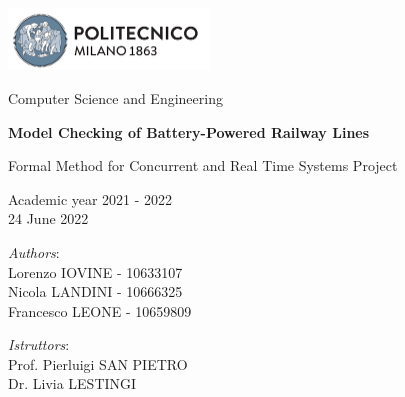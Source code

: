 
\usepackage{listings}





{\begin{titlepage}
     \begin{center}
         \includegraphics[width=0.4\textwidth]{images/PolimiLogo.png}

         \vspace{0.2cm}

         \Large Computer Science and Engineering

         \vspace{0.9cm}

         \Huge \textbf{Model Checking of Battery-Powered Railway Lines}

         \vspace{0.7cm}
         \huge Formal Method for Concurrent and Real Time Systems Project

         \vspace{1.5cm}
         \Large Academic year 2021 - 2022\\
         \vspace{1cm}
         24 June 2022
         \vspace{3cm}

         \large
         \begin{minipage}{.1\textwidth}
             \null
         \end{minipage}%
         \begin{minipage}{.4\textwidth}
             \textit{Authors}:\\
             Lorenzo IOVINE - 10633107\\
             Nicola LANDINI - 10666325\\
             Francesco LEONE - 10659809
         \end{minipage}%
         \begin{minipage}{.4\textwidth}
             \raggedleft
             \textit{Istruttors}:\\
             Prof. Pierluigi SAN PIETRO\\
             Dr. Livia LESTINGI\\
             \phantom{placeholder}
         \end{minipage}%
         \begin{minipage}{.1\textwidth}
             \null
         \end{minipage}


     \end{center}
\end{titlepage}}~\\

